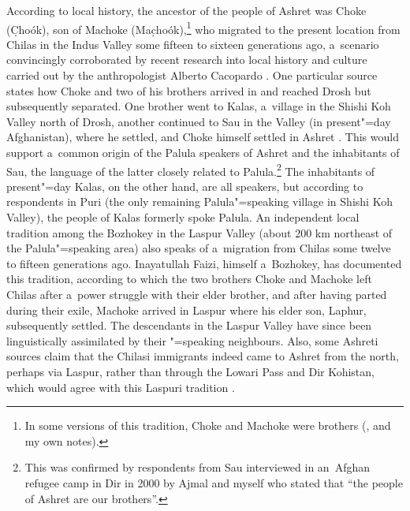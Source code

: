 According to local history, the ancestor of the people of Ashret was Choke (C̣hoók), son of
Machoke (Mac̣hoók),\footnote{In some versions of this tradition, Choke and Machoke were brothers
  (\citealt[85]{cacopardo2001}, and my own notes).} who migrated to the present location from
Chilas in the Indus Valley some fifteen to sixteen generations ago, a~scenario convincingly corroborated by
recent research into local history and culture carried out by the anthropologist Alberto Cacopardo
\citep[84--93]{cacopardo2001}. One particular source states how Choke and two of his brothers
arrived in \iliChitral and reached Drosh but subsequently separated. One brother went to Kalas,
a~village in the Shishi Koh Valley north of Drosh, another continued to Sau in the \iliKunar Valley (in
present"=day Afghanistan), where he settled, and Choke himself settled in Ashret
\citep[84]{cacopardo2001}. This would support a~common origin of the Palula speakers of Ashret and
the inhabitants of Sau, the language of the latter closely related to Palula.\footnote{This was
  confirmed by respondents from Sau interviewed in an~Afghan refugee camp in Dir in 2000 by Ajmal
  \iliNuristani and myself who stated that ``the people of Ashret are our brothers''.} The inhabitants
of present"=day Kalas, on the other hand, are all \iliKhowar speakers, but according to respondents in
Puri (the only remaining Palula"=speaking village in Shishi Koh Valley), the people of Kalas formerly
spoke Palula. An independent local tradition among the Bozhokey in the Laspur Valley (about 200 km
northeast of the Palula"=speaking area) also speaks of a~migration from Chilas some twelve to fifteen
generations ago. Inayatullah Faizi, himself a~Bozhokey, has documented this tradition, according
to which the two brothers Choke and Machoke left Chilas after a~power struggle with their elder
brother, and after having parted during their exile, Machoke arrived in Laspur where his elder son,
Laphur, subsequently settled. The descendants in the Laspur Valley have since been linguistically
assimilated by their \iliKhowar"=speaking neighbours. Also, some Ashreti sources claim that the Chilasi
immigrants indeed came to Ashret from the north, perhaps via Laspur, rather than through the Lowari
Pass and Dir Kohistan, which would agree with this Laspuri tradition \citep[85, 125--126]{cacopardo2001}.


